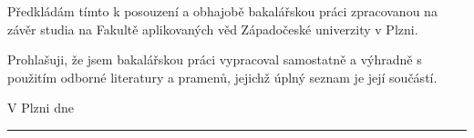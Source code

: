 
\begin{declaration}
Předkládám tímto k posouzení a obhajobě bakalářskou práci zpracovanou na závěr studia na Fakultě aplikovaných věd Západočeské univerzity v Plzni.

Prohlašuji, že jsem bakalářskou práci vypracoval samostatně a výhradně s použitím odborné literatury a pramenů, jejichž úplný seznam je její součástí.

\vspace{10em}
V Plzni dne  \hfill \rule[-0.15em]{13em}{0.5pt} %
 
 
\end{declaration}

\cleardoublepage